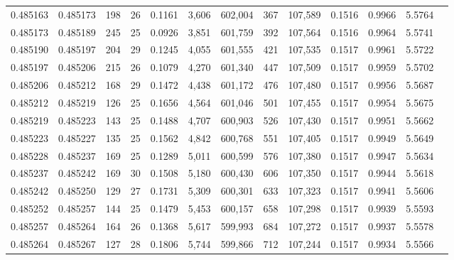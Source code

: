 \begin{tabular}{rrrrrrrrrrrrr}
0.485163 & 0.485173 & 198 &  26 &                                     0.1161 &   3,606 & 602,004 &     367 & 107,589 & 0.1516 & 0.9966 & 5.5764 \\
0.485173 & 0.485189 & 245 &  25 &                                     0.0926 &   3,851 & 601,759 &     392 & 107,564 & 0.1516 & 0.9964 & 5.5741 \\
0.485190 & 0.485197 & 204 &  29 &                                     0.1245 &   4,055 & 601,555 &     421 & 107,535 & 0.1517 & 0.9961 & 5.5722 \\
0.485197 & 0.485206 & 215 &  26 &                                     0.1079 &   4,270 & 601,340 &     447 & 107,509 & 0.1517 & 0.9959 & 5.5702 \\
0.485206 & 0.485212 & 168 &  29 &                                     0.1472 &   4,438 & 601,172 &     476 & 107,480 & 0.1517 & 0.9956 & 5.5687 \\
0.485212 & 0.485219 & 126 &  25 &                                     0.1656 &   4,564 & 601,046 &     501 & 107,455 & 0.1517 & 0.9954 & 5.5675 \\
0.485219 & 0.485223 & 143 &  25 &                                     0.1488 &   4,707 & 600,903 &     526 & 107,430 & 0.1517 & 0.9951 & 5.5662 \\
0.485223 & 0.485227 & 135 &  25 &                                     0.1562 &   4,842 & 600,768 &     551 & 107,405 & 0.1517 & 0.9949 & 5.5649 \\
0.485228 & 0.485237 & 169 &  25 &                                     0.1289 &   5,011 & 600,599 &     576 & 107,380 & 0.1517 & 0.9947 & 5.5634 \\
0.485237 & 0.485242 & 169 &  30 &                                     0.1508 &   5,180 & 600,430 &     606 & 107,350 & 0.1517 & 0.9944 & 5.5618 \\
0.485242 & 0.485250 & 129 &  27 &                                     0.1731 &   5,309 & 600,301 &     633 & 107,323 & 0.1517 & 0.9941 & 5.5606 \\
0.485252 & 0.485257 & 144 &  25 &                                     0.1479 &   5,453 & 600,157 &     658 & 107,298 & 0.1517 & 0.9939 & 5.5593 \\
0.485257 & 0.485264 & 164 &  26 &                                     0.1368 &   5,617 & 599,993 &     684 & 107,272 & 0.1517 & 0.9937 & 5.5578 \\
0.485264 & 0.485267 & 127 &  28 &                                     0.1806 &   5,744 & 599,866 &     712 & 107,244 & 0.1517 & 0.9934 & 5.5566 \\

\end{tabular}
